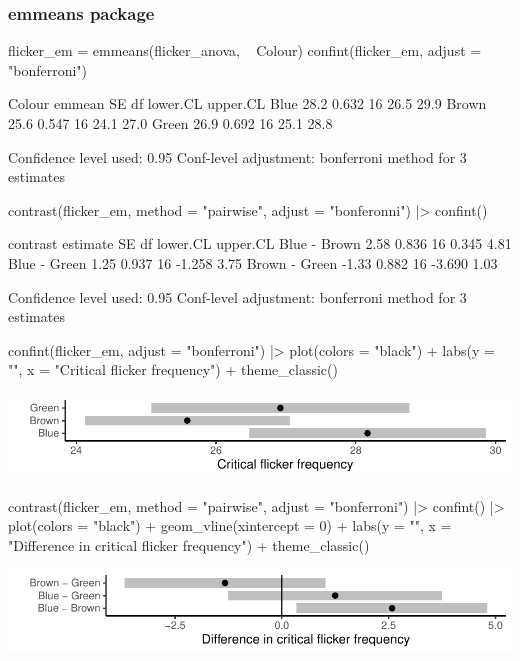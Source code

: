\documentclass[a4paper]{article}
\begin{document}
\subsubsection{emmeans package}
\begin{Schunk}
\begin{Sinput}
flicker_em = emmeans(flicker_anova, ~ Colour)
confint(flicker_em, adjust = "bonferroni")
\end{Sinput}
\begin{Soutput}
 Colour emmean    SE df lower.CL upper.CL
 Blue     28.2 0.632 16     26.5     29.9
 Brown    25.6 0.547 16     24.1     27.0
 Green    26.9 0.692 16     25.1     28.8

Confidence level used: 0.95 
Conf-level adjustment: bonferroni method for 3 estimates 
\end{Soutput}
\begin{Sinput}
contrast(flicker_em, method = "pairwise", adjust = "bonferonni") |> confint() 
\end{Sinput}
\begin{Soutput}
 contrast      estimate    SE df lower.CL upper.CL
 Blue - Brown      2.58 0.836 16    0.345     4.81
 Blue - Green      1.25 0.937 16   -1.258     3.75
 Brown - Green    -1.33 0.882 16   -3.690     1.03

Confidence level used: 0.95 
Conf-level adjustment: bonferroni method for 3 estimates 
\end{Soutput}
\begin{Sinput}
confint(flicker_em, adjust = "bonferroni") |> plot(colors = "black") + 
  labs(y = "", x = "Critical flicker frequency") +
  theme_classic()
\end{Sinput}


{\centering \includegraphics[width=\maxwidth]{figure/listings-unnamed-chunk-248-1} 

}

\begin{Sinput}
contrast(flicker_em, method = "pairwise", adjust = "bonferroni") |> confint()  |> 
  plot(colors = "black") + geom_vline(xintercept = 0) + 
  labs(y = "", x = "Difference in critical flicker frequency") +
  theme_classic()
\end{Sinput}


{\centering \includegraphics[width=\maxwidth]{figure/listings-unnamed-chunk-248-2} 

}

\end{Schunk}
\end{document}
